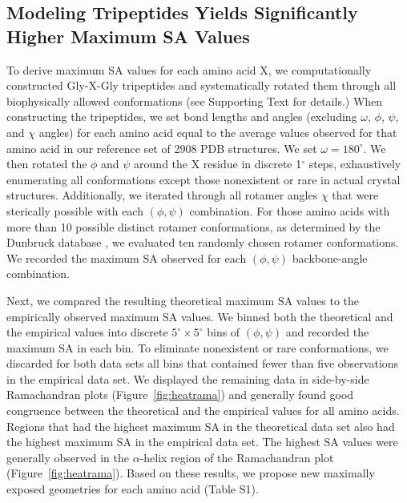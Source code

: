 \documentclass[11pt]{article}
\begin{document}
\subsection*{Modeling Tripeptides Yields Significantly Higher Maximum SA Values}
To derive maximum SA values for each amino acid X, we computationally constructed Gly-X-Gly tripeptides and systematically rotated them through all biophysically allowed  conformations (see Supporting Text for details.) When constructing the tripeptides, we set bond lengths and angles (excluding $\omega$, $\phi$, $\psi$, and $\chi$ angles) for each amino acid equal to the average values observed for that amino acid in our reference set of 2908 PDB structures. We set $\omega=180^\circ$. We then rotated the $\phi$ and $\psi$ around the X residue in  discrete 1$^\circ$ steps, exhaustively enumerating all conformations except those nonexistent or rare in actual crystal structures. Additionally, we iterated through all rotamer angles $\chi$ that were sterically possible with each $(\phi, \psi)$ combination. For those amino acids with more than 10 possible distinct rotamer conformations, as determined by the Dunbruck database \cite{WangDunbrack2003}, we evaluated ten randomly chosen rotamer conformations. We recorded the maximum SA observed for each $(\phi, \psi)$ backbone-angle combination.

Next, we compared the resulting theoretical maximum SA values to the empirically observed maximum SA values. We binned both the theoretical and the empirical values into discrete $5^\circ\times5^\circ$ bins of $(\phi, \psi)$ and recorded the maximum SA in each bin. To eliminate nonexistent or rare conformations, we discarded for both data sets all bins that contained fewer than five observations in the empirical data set. We displayed the remaining data in side-by-side Ramachandran plots (Figure~\ref{fig:heatrama}) and generally found good congruence between the theoretical and the empirical values for all amino acids. Regions that had the highest maximum SA in the theoretical data set also had the highest maximum SA in the empirical data set. The highest SA values were generally observed in the $\alpha$-helix region of the Ramachandran plot (Figure~\ref{fig:heatrama}). Based on these results, we propose new maximally exposed geometries for each amino acid (Table S1).
\end{document}
